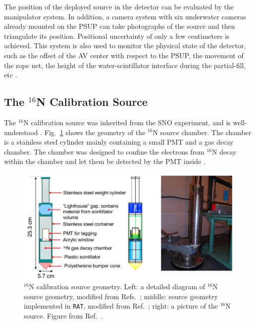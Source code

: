 The position of the deployed source in the detector can be evaluated by the manipulator system. In addition, a camera system with six underwater cameras already mounted on the PSUP can take photographs of the source and then triangulate its position. Positional uncertainty of only a few centimeters is achieved. This system is also used to monitor the physical state of the detector, such as the offset of the AV center with respect to the PSUP, the movement of the rope net, the height of the water-scintillator interface during the partial-fill, etc \cite{snop_jinst,singh2020underwater}.

\subsection{The $^{16}$N Calibration Source}\label{sect:n16}

The $^{16}$N calibration source was inherited from the SNO experiment, and is well-understood \cite{dragowsky1999sudbury,dragowsky200216n,hamer2001energy}. Fig.~\ref{n16pic} shows the geometry of the $^{16}$N source chamber. The chamber is a stainless steel cylinder mainly containing a small PMT and a gas decay chamber. The chamber was designed to confine the electrons from $^{16}$N decay within the chamber and let them be detected by the PMT inside \cite{dragowsky1999sudbury}.

\begin{figure}[!htb]
	\centering
	\includegraphics[width=12cm]{n16geom.png}
	\caption[$^{16}$N calibration source geometry.]{$^{16}$N calibration source geometry. Left: a detailed diagram of $^{16}$N source geometry, modified from Refs.~\cite{maclellan2009energy,matt_deployedsource}; middle: source geometry implemented in \texttt{RAT}, modified from Ref.~\cite{n16geom_zach}; right: a picture of the $^{16}$N source. Figure from Ref.~\cite{n16pic}.}
	\label{n16pic}
\end{figure}

